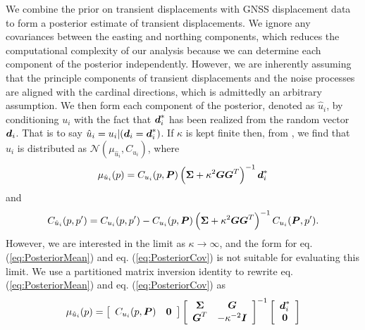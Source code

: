 \documentclass[extra,mreferee]{gji}
\begin{document}
We combine the prior on transient displacements with GNSS displacement data to form a posterior estimate of transient displacements. We ignore any covariances between the easting and northing components, which reduces the computational complexity of our analysis because we can determine each component of the posterior independently. However, we are inherently assuming that the principle components of transient displacements and the noise processes are aligned with the cardinal directions, which is admittedly an arbitrary assumption. We then form each component of the posterior, denoted as $\hat{u}_i$, by conditioning $u_i$ with the fact that $\mitbf{d}^*_i$ has been realized from the random vector $\mitbf{d}_i$. That is to say $\hat{u}_i = u_i |(\mitbf{d}_i = \mitbf{d}^*_i)$. If $\kappa$ is kept finite then, from \citet[sec. 2.2]{Rasmussen2006}, we find that $\hat{u}_i$ is distributed as $\mathcal{N}(\mu_{\hat{u}_i},C_{\hat{u}_i})$, where
\begin{equation}\label{eq:PosteriorMean}
\mu_{\hat{u}_i}(p) = C_{u_i}(p,\mitbf{P})\left(\mitbf{\Sigma} + \kappa^2\mitbf{G}\mitbf{G}^T\right)^{-1}\mitbf{d}^*_i
\end{equation}    
and
\begin{equation}\label{eq:PosteriorCov}
C_{\hat{u}_i}(p,p') = C_{u_i}(p,p') - C_{u_i}(p,\mitbf{P})\left(\mitbf{\Sigma} + \kappa^2\mitbf{G}\mitbf{G}^T\right)^{-1}C_{u_i}(\mitbf{P},p').
\end{equation}
However, we are interested in the limit as $\kappa \to \infty$, and the form for eq. (\ref{eq:PosteriorMean}) and eq. (\ref{eq:PosteriorCov}) is not suitable for evaluating this limit. We use a partitioned matrix inversion identity \citep[sec. 2.7.4]{Press2007} to rewrite eq. (\ref{eq:PosteriorMean}) and eq. (\ref{eq:PosteriorCov}) as
 \begin{equation}\label{eq:PosteriorMean2}
\mu_{\hat{u}_i}(p) = \left[\begin{array}{cc}
                         C_{u_i}(p,\mitbf{P}) & \mitbf{0} \\
                         \end{array}\right]
                   \left[\begin{array}{cc}
                         \mitbf{\Sigma} & \mitbf{G} \\
                         \mitbf{G}^T  & -\kappa^{-2} \mitbf{I} \\
                         \end{array}\right]^{-1}
                   \left[\begin{array}{c}
                         \mitbf{d}^*_i \\
                         \mitbf{0} \\
                         \end{array}\right]
\end{equation}    
\end{document}
